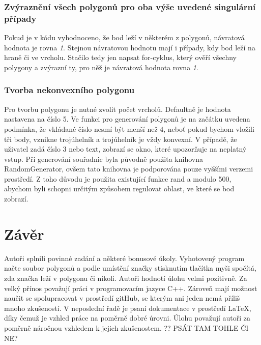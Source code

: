 \documentclass[a4paper, 12pt]{article}
\begin{document}
\subsubsection{Zvýraznění všech polygonů pro oba výše uvedené singulární případy}
Pokud je v kódu vyhodnoceno, že bod leží v některém z polygonů, návratová hodnota je rovna \textit{1}. Stejnou návratovou hodnotu mají i případy, kdy bod leží na hraně či ve vrcholu. Stačilo tedy jen napsat for-cyklus, který ověří všechny polygony a zvýrazní ty, pro něž je návratová hodnota rovna \textit{1}. 

\subsubsection{Tvorba nekonvexního polygonu}
Pro tvorbu polygonu je nutné zvolit počet vrcholů. Defaultně je hodnota nastavena na číslo 5. Ve funkci pro generování polygonů je na začátku uvedena podmínka, že vkládané číslo nesmí být menší než 4, neboť pokud bychom vložili tři body, vznikne trojúhelník a trojúhelník je vždy konvexní. V případě, že uživatel zadá číslo 3 nebo text, zobrazí se okno, které upozorňuje na neplatný vstup. Při generování souřadnic byla původně použita knihovna RandomGenerator, ovšem tato knihovna je podporována pouze vyššími verzemi prostředí. Z toho důvodu je použita existující funkce rand a modulo 500, abychom byli schopni určitým způsobem regulovat oblast, ve které se bod zobrazí.

\clearpage
\section{Závěr}
Autoři splnili povinné zadání a některé bonusové úkoly. Vyhotovený program načte soubor polygonů a podle umístění značky stisknutím tlačítka myši spočítá, zda značka leží v polygonu či nikoli. Autoři hodnotí úlohu velmi pozitivně. Za velký přínos považují práci v programovacím jazyce C++. Zároveň mají možnost naučit se spolupracovat v prostředí gitHub, se kterým ani jeden nemá příliš mnoho zkušeností. V neposlední řadě je psaní dokumentace v prostředí LaTeX, díky čemuž je vzhled práce na poměrně dobré úrovni. Úlohu považují autoři za poměrně náročnou vzhledem k jejich zkušenostem. ?? PSÁT TAM TOHLE ČI NE?\\
\end{document}
